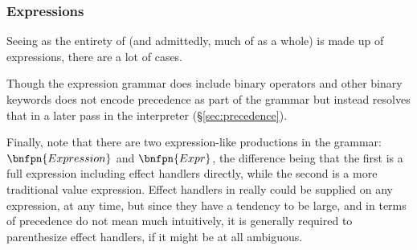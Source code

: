 \subsubsection{Expressions}
\label{sec:expressions}

Seeing as the entirety of \Poetry{} (and admittedly, much of \Trilogy{} as a whole)
is made up of expressions, there are a lot of cases.

Though the expression grammar does include binary operators and other binary keywords
\Trilogy{} does not encode precedence as part of the grammar but instead resolves that
in a later pass in the interpreter (\S\ref{sec:precedence}).

Finally, note that there are two expression-like productions in the grammar:
$\bnfpn{Expression}$ and $\bnfpn{Expr}$, the difference being that the first
is a full expression including effect handlers directly, while the second is
a more traditional value expression. Effect handlers in \Trilogy{} really
could be supplied on any expression, at any time, but since they have a tendency
to be large, and in terms of precedence do not mean much intuitively, it is
generally required to parenthesize effect handlers, if it might be at all
ambiguous.

\begin{bnf*}
     \\
     \\
     \\
     \\
     \\
     \\
     \\
\end{bnf*}
